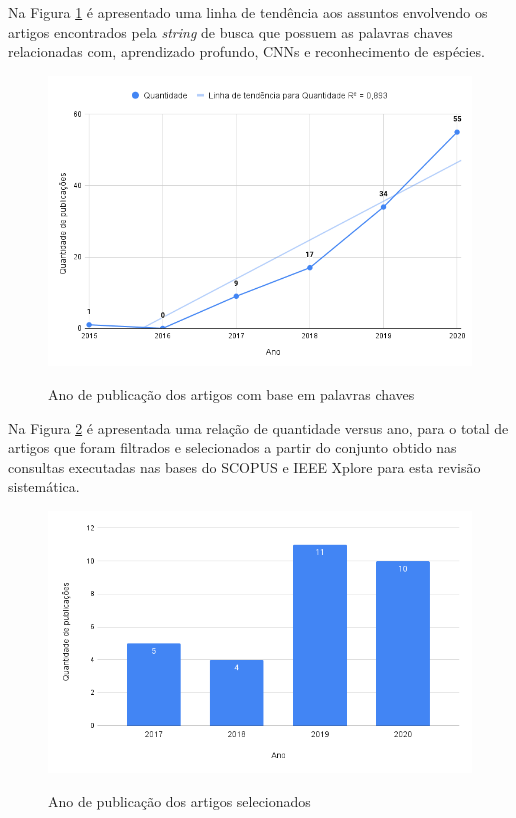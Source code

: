 \documentclass[
	12pt,				%
	oneside,			%
	a4paper,			%
	english,			%
	brazil				%
	]{abntex2ppgsi}
\begin{document}
Na Figura \ref{fig:grafico_ano_vs_quantidade} é apresentado uma linha de tendência aos assuntos envolvendo os artigos encontrados pela \textit{string} de busca que possuem as palavras chaves relacionadas com, aprendizado profundo, CNNs e reconhecimento de espécies.

\begin{figure}[H]
    \centering
    \caption{Ano de publicação dos artigos com base em palavras chaves}
    \includegraphics[width=1.0\textwidth]{imagens/revisao_sistematica/grafico_ano_vs_quantidade.png}
    \label{fig:grafico_ano_vs_quantidade}
\end{figure}

Na Figura \ref{fig:grafico_ano_vs_publicacao} é apresentada uma relação de quantidade versus ano, para o total de artigos que foram filtrados e selecionados a partir do conjunto obtido nas consultas executadas nas bases do SCOPUS e IEEE Xplore para esta revisão sistemática.

\begin{figure}[H]
    \centering
    \caption{Ano de publicação dos artigos selecionados}
    \includegraphics[width=1.0\textwidth]{imagens/revisao_sistematica/grafico_ano_vs_publicacao.png}
    \label{fig:grafico_ano_vs_publicacao}
\end{figure}
\end{document}
